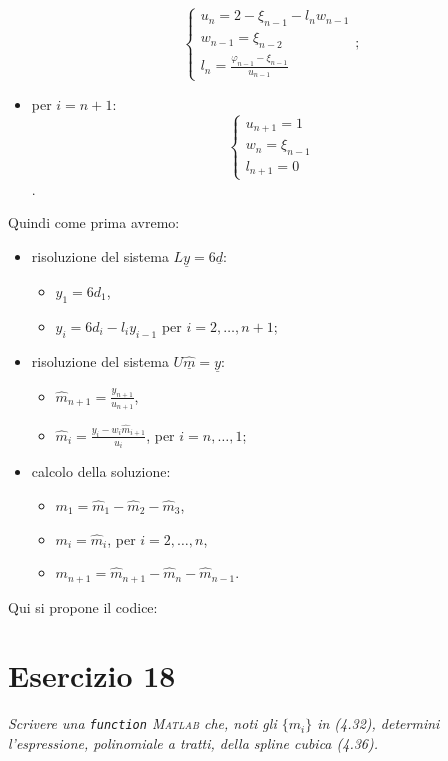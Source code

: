 \begin{sol}
\begin{itemize}
			\[
				\begin{cases}
					u_n=2-\xi_{n-1}-l_nw_{n-1}\\
					w_{n-1}=\xi_{n-2}\\
					l_n=\frac{\varphi_{n-1}-\xi_{n-1}}{u_{n-1}}
				\end{cases};
			\]
		\item per $i=n+1$:
			\[
				\begin{cases}
					u_{n+1}=1\\
					w_n=\xi_{n-1}\\
					l_{n+1}=0
				\end{cases}
			\].
	\end{itemize}
	Quindi come prima avremo:
	\begin{itemize}
		\item risoluzione del sistema $L\underline{y}= 6\underline{d}$:
			\begin{itemize}
				\item $y_1=6d_1$,
				\item $y_i=6d_i-l_iy_{i-1}$ per $i=2,\dots,n+1$;
			\end{itemize}
		\item risoluzione del sistema $U\underline{\hat{m}}=\underline{y}$:
			\begin{itemize}
				\item $\hat{m}_{n+1}=\frac{y_{n+1}}{u_{n+1}}$,
				\item $\hat{m}_{i}=\frac{y_i-w_i \hat{m}_{i+1}}{u_i}$, per $i=n, \dots ,1$;
			\end{itemize}
		\item calcolo della soluzione:
			\begin{itemize}
				\item $m_1=\hat{m}_1-\hat{m}_2-\hat{m}_3$,
				\item $m_i=\hat{m}_i$, per $i=2,\dots,n$,
				\item $m_{n+1}=\hat{m}_{n+1}-\hat{m}_n-\hat{m}_{n-1}$.
			\end{itemize}
	\end{itemize}
	Qui si propone il codice:\\
	
\end{sol}

\section{Esercizio 18}
\label{sub:Esercizio 18}
\emph{Scrivere una \lstinline{function} \textsc{Matlab} che, noti gli $\{m_i\}$ in (4.32), determini l'espressione,
polinomiale a tratti, della spline cubica (4.36).}
\begin{sol}
	
\end{sol}


